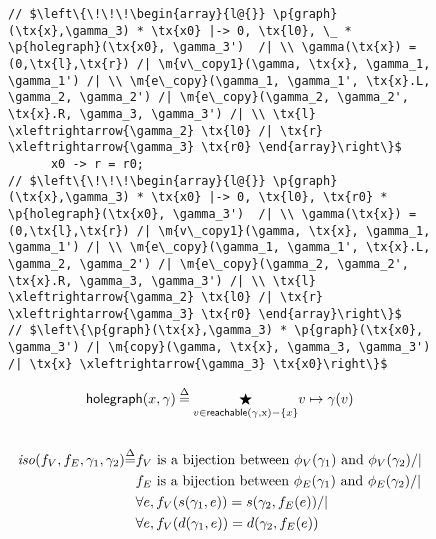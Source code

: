 \begin{figure}
  \begin{lstlisting}
// $\left\{\!\!\!\begin{array}{l@{}} \p{graph}(\tx{x},\gamma_3) * \tx{x0} |-> 0, \tx{l0}, \_ * \p{holegraph}(\tx{x0}, \gamma_3')  /| \\ \gamma(\tx{x}) = (0,\tx{l},\tx{r}) /| \m{v\_copy1}(\gamma, \tx{x}, \gamma_1, \gamma_1') /| \\ \m{e\_copy}(\gamma_1, \gamma_1', \tx{x}.L, \gamma_2, \gamma_2') /| \m{e\_copy}(\gamma_2, \gamma_2', \tx{x}.R, \gamma_3, \gamma_3') /| \\ \tx{l} \xleftrightarrow{\gamma_2} \tx{l0} /| \tx{r} \xleftrightarrow{\gamma_3} \tx{r0} \end{array}\right\}$
      x0 -> r = r0;
// $\left\{\!\!\!\begin{array}{l@{}} \p{graph}(\tx{x},\gamma_3) * \tx{x0} |-> 0, \tx{l0}, \tx{r0} * \p{holegraph}(\tx{x0}, \gamma_3')  /| \\ \gamma(\tx{x}) = (0,\tx{l},\tx{r}) /| \m{v\_copy1}(\gamma, \tx{x}, \gamma_1, \gamma_1') /| \\ \m{e\_copy}(\gamma_1, \gamma_1', \tx{x}.L, \gamma_2, \gamma_2') /| \m{e\_copy}(\gamma_2, \gamma_2', \tx{x}.R, \gamma_3, \gamma_3') /| \\ \tx{l} \xleftrightarrow{\gamma_2} \tx{l0} /| \tx{r} \xleftrightarrow{\gamma_3} \tx{r0} \end{array}\right\}$
// $\left\{\p{graph}(\tx{x},\gamma_3) * \p{graph}(\tx{x0}, \gamma_3') /| \m{copy}(\gamma, \tx{x}, \gamma_3, \gamma_3') /| \tx{x} \xleftrightarrow{\gamma_3} \tx{x0}\right\}$
  \end{lstlisting}
  \small
\begin{gather*}
  \p{holegraph}(x, \gamma)\defeq \underset{v\in\p{reachable}(\gamma, \tx x) - \{x\}}{\bigstar}v \mapsto \gamma(v)\\
\, \\
  \begin{split}
  \m{iso}(f_V, f_E, \gamma_1, \gamma_2) \defeq 
& f_V \text{ is a bijection between $\phi_V(\gamma_1)$ and $\phi_V(\gamma_2)$} /| \\
& f_E \text{ is a bijection between $\phi_E(\gamma_1)$ and $\phi_E(\gamma_2)$}  /| \\
& \forall e, f_V(s(\gamma_1, e)) = s(\gamma_2, f_E(e)) /| \\
& \forall e, f_V(d(\gamma_1, e)) = d(\gamma_2, f_E(e)) 
  \end{split} \\
  \begin{split}

\end{split}
\end{gather*}
\end{figure}
